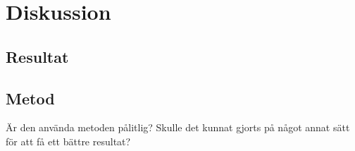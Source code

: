 \section{Diskussion}


\subsection{Resultat}


\subsection{Metod}
Är den använda metoden pålitlig? Skulle det kunnat gjorts på något annat sätt för att få ett bättre resultat?

